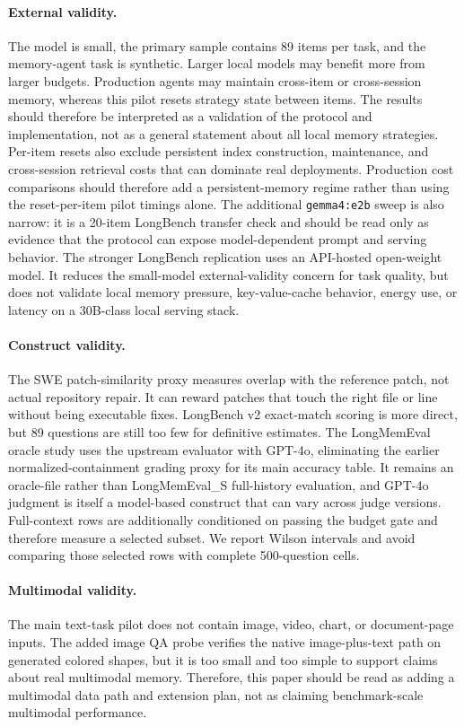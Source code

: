 \documentclass[11pt]{article}
\begin{document}
\paragraph{External validity.}
The model is small, the primary sample contains 89 items per task, and the
memory-agent task is synthetic.  Larger local models may benefit more from
larger budgets.  Production agents may maintain cross-item or cross-session
memory, whereas this pilot resets strategy state between items.  The results
should therefore be interpreted as a validation of the protocol and
implementation, not as a general statement about all local memory strategies.
Per-item resets also exclude persistent index construction, maintenance, and
cross-session retrieval costs that can dominate real deployments.  Production
cost comparisons should therefore add a persistent-memory regime rather than
using the reset-per-item pilot timings alone.
The additional \texttt{gemma4:e2b} sweep is also narrow: it is a 20-item
LongBench transfer check and should be read only as evidence that the protocol
can expose model-dependent prompt and serving behavior.
The stronger LongBench replication uses an API-hosted open-weight model.  It
reduces the small-model external-validity concern for task quality, but does
not validate local memory pressure, key-value-cache behavior, energy use, or
latency on a 30B-class local serving stack.

\paragraph{Construct validity.}
The SWE patch-similarity proxy measures overlap with the reference patch, not
actual repository repair.  It can reward patches that touch the right file or
line without being executable fixes.  LongBench v2 exact-match scoring is more
direct, but 89 questions are still too few for definitive estimates.  The
LongMemEval oracle study uses the upstream evaluator with GPT-4o, eliminating
the earlier normalized-containment grading proxy for its main accuracy table.
It remains an oracle-file rather than LongMemEval\_S full-history evaluation,
and GPT-4o judgment is itself a model-based construct that can vary across
judge versions.  Full-context rows are additionally conditioned on passing
the budget gate and therefore measure a selected subset.  We report Wilson
intervals and avoid comparing those selected rows with complete 500-question
cells.

\paragraph{Multimodal validity.}
The main text-task pilot does not contain image, video, chart, or
document-page inputs.  The added image QA probe verifies the native
image-plus-text path on generated colored shapes, but it is too small and too
simple to support claims about real multimodal memory.  Therefore, this paper
should be read as adding a multimodal data path and extension plan, not as
claiming benchmark-scale multimodal performance.
\end{document}
